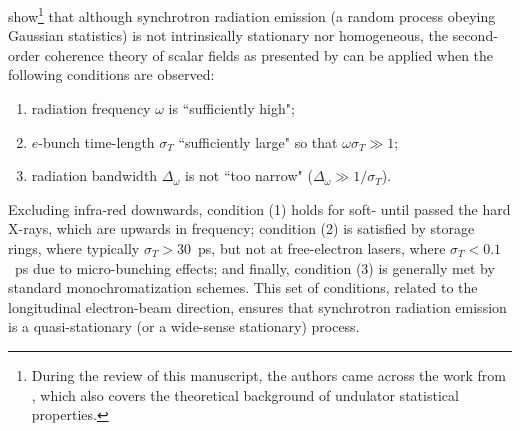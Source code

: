 \documentclass[preprint]{iucr}
\newcommand{\inred}[1]{{\color{red}#1}}
\begin{document}
 show\footnote{\inred{During the review of this manuscript, the authors came across the work from  \citeasnoun{Trebushinin2022}, which also covers the theoretical background of undulator statistical properties.}} that although synchrotron radiation emission (a random process obeying Gaussian statistics) is not intrinsically stationary nor homogeneous, \inred{the} second\inred{-}order coherence theory of scalar fields as presented by  can be applied when the following conditions are observed:
\begin{enumerate}%
\item radiation frequency $\omega$ is ``sufficiently high";
\item $e$-bunch time-length $\sigma_{T}$ ``sufficiently large" so that $\omega\sigma_{T}\gg1$;
\item radiation bandwidth $\Delta_\omega$ is not ``too narrow" ($\Delta_\omega\gg1\big/\sigma_{T}$).
\end{enumerate}
\inred{E}xcluding infra-red downwards, condition (1) holds for soft- \inred{until passed the} hard X-rays, which are upwards in frequency; condition (2) is satisfied by storage rings, where typically $\sigma_{T}>30$~ps, but not at free-electron lasers, where $\sigma_{T}<0.1$~ps due to micro-bunching effects; and finally, condition (3) is generally met by standard monochromati\inred{z}ation schemes. This set of conditions, related to the longitudinal electron-beam direction, ensures that synchrotron radiation emission is a quasi-stationary (or a wide-sense stationary) process. 
\end{document}
